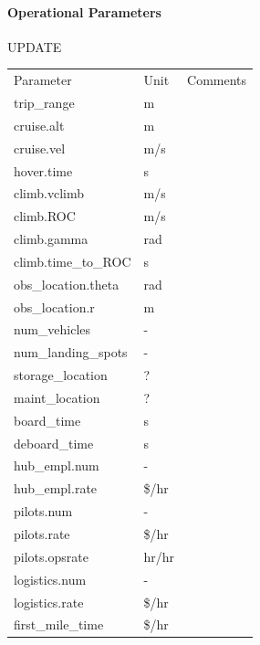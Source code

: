 \paragraph{Operational Parameters}
UPDATE
\begin{table}[h]
\begin{tabular}{lll}
Parameter               & Unit      & Comments \\
trip\_range             & m         &          \\
cruise.alt              & m         &          \\
cruise.vel              & m/s       &          \\
hover.time              & s         &          \\
climb.vclimb            & m/s       &          \\
climb.ROC               & m/s       &          \\
climb.gamma             & rad       &          \\
climb.time\_to\_ROC     & s         &          \\
obs\_location.theta      & rad       &          \\
obs\_location.r          & m         &          \\
num\_vehicles           & -         &          \\
num\_landing\_spots     & -         &          \\
storage\_location       & ?         &          \\
maint\_location         & ?         &          \\
board\_time             & s         &          \\
deboard\_time           & s         &          \\
hub\_empl.num           & -         &          \\
hub\_empl.rate          & \$/hr     &          \\
pilots.num              & -         &          \\
pilots.rate             & \$/hr     &          \\
pilots.opsrate          & hr/hr     &          \\
logistics.num           & -         &          \\
logistics.rate          & \$/hr     &          \\
first\_mile\_time       & \$/hr     &          \\
\end{tabular}
\end{table}

